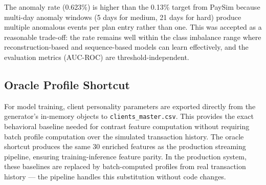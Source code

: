 The anomaly rate (0.623\%) is higher than the 0.13\% target from PaySim because
multi-day anomaly windows (5 days for medium, 21 days for hard) produce multiple
anomalous events per plan entry rather than one. This was accepted as a reasonable
trade-off: the rate remains well within the class imbalance range where
reconstruction-based and sequence-based models can learn effectively, and the
evaluation metrics (AUC-ROC) are threshold-independent.

\subsection{Oracle Profile Shortcut}

For model training, client personality parameters are exported directly from the
generator's in-memory objects to \texttt{clients\_master.csv}. This provides the
exact behavioral baseline needed for contrast feature computation without requiring
batch profile computation over the simulated transaction history. The oracle
shortcut produces the same 30 enriched features as the production streaming
pipeline, ensuring training-inference feature parity. In the production system,
these baselines are replaced by batch-computed profiles from real transaction
history --- the pipeline handles this substitution without code changes.